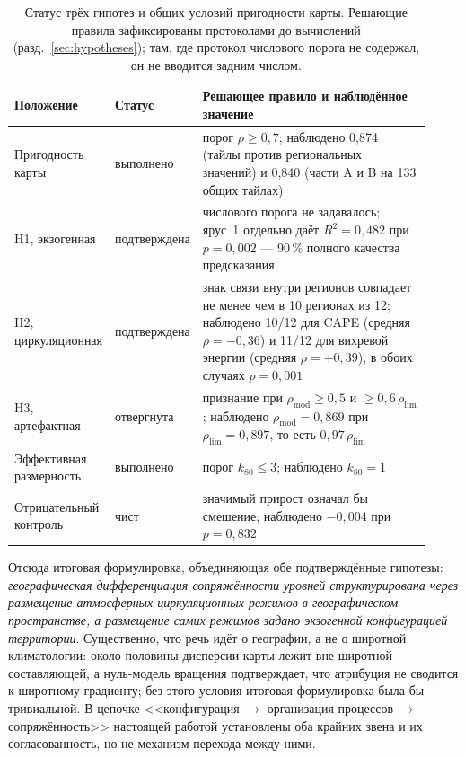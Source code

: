 \documentclass[11pt,a4paper]{article}
\begin{document}
\begin{table}[t]
\centering
\caption{Статус трёх гипотез и общих условий пригодности карты. Решающие правила зафиксированы протоколами до вычислений (разд.~\ref{sec:hypotheses}); там, где протокол числового порога не содержал, он не вводится задним числом.}
\label{tab:hyp}
\small
\begin{tabular}{@{}p{0.20\linewidth}p{0.15\linewidth}p{0.57\linewidth}@{}}
\toprule
Положение & Статус & Решающее правило и наблюдённое значение\\
\midrule
Пригодность карты & выполнено & порог $\rho\ge0{,}7$; наблюдено 0,874 (тайлы против региональных значений) и 0,840 (части A и B на 133 общих тайлах)\\
H1, экзогенная & подтверждена & числового порога не задавалось; ярус~1 отдельно даёт $R^2=0{,}482$ при $p=0{,}002$ --- 90\,\% полного качества предсказания\\
H2, циркуляционная & подтверждена & знак связи внутри регионов совпадает не менее чем в 10 регионах из 12; наблюдено 10/12 для CAPE (средняя $\rho=-0{,}36$) и 11/12 для вихревой энергии (средняя $\rho=+0{,}39$), в обоих случаях $p=0{,}001$\\
H3, артефактная & отвергнута & признание при $\rho_{\mathrm{mod}}\ge0{,}5$ и $\ge0{,}6\,\rho_{\mathrm{lim}}$; наблюдено $\rho_{\mathrm{mod}}=0{,}869$ при $\rho_{\mathrm{lim}}=0{,}897$, то есть $0{,}97\,\rho_{\mathrm{lim}}$\\
Эффективная размерность & выполнено & порог $k_{80}\le3$; наблюдено $k_{80}=1$\\
Отрицательный контроль & чист & значимый прирост означал бы смешение; наблюдено $-0{,}004$ при $p=0{,}832$\\
\bottomrule
\end{tabular}
\end{table}


Отсюда итоговая формулировка, объединяющая обе подтверждённые гипотезы: \emph{географическая дифференциация сопряжённости уровней структурирована через размещение атмосферных циркуляционных режимов в географическом пространстве, а размещение самих режимов задано экзогенной конфигурацией территории}. Существенно, что речь идёт о географии, а не о широтной климатологии: около половины дисперсии карты лежит вне широтной составляющей, а нуль-модель вращения подтверждает, что атрибуция не сводится к широтному градиенту; без этого условия итоговая формулировка была бы тривиальной. В цепочке <<конфигурация $\to$ организация процессов $\to$ сопряжённость>> настоящей работой установлены оба крайних звена и их согласованность, но не механизм перехода между ними.
\end{document}
